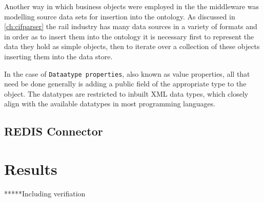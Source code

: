  Another way in which business objects were employed in the the middleware was modelling source data sets for insertion into the ontology. As discussed in \autoref{ch:cifparser} the rail industry has many data sources in a variety of formats and in order as to insert them into the ontology it is necessary first to represent the data they hold as simple objects, then to iterate over a collection of these objects inserting them into the data store.

In the case of \texttt{Dataatype properties}, also known as value properties, all that need be done generally is adding a public field of the appropriate type to the object. The datatypes are restricted to inbuilt XML data types, which closely align with the available datatypes in most programming languages. 

\subsection{REDIS Connector}

\section{Results}
*****Including verifiation